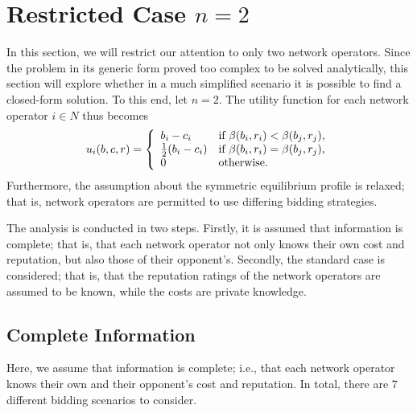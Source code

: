 \section{Restricted Case $n=2$} %
\label{sec:direct_restricted_case_n_2_direct}
In this section, we will restrict our attention to only two network operators. Since the problem in its generic form proved too complex to be solved analytically, this section will explore whether in a much simplified scenario it is possible to find a closed-form solution. To this end, let $n=2$. The utility function for each network operator $i\in N$ thus becomes
\begin{equation}
	\label{eq:utility_n_2_direct}
	u_i(b,c,r) = \left\{
	\begin{array}{l l}
		b_i - c_i &\text{if } \beta(b_i,r_i) < \beta(b_j,r_j),\\
		\frac{1}{2}(b_i - c_i) &\text{if } \beta(b_i,r_i) = \beta(b_j,r_j),\\
		0 &\text{otherwise}.
	\end{array}\right.
\end{equation}
Furthermore, the assumption about the symmetric equilibrium profile is relaxed; that is, network operators are permitted to use differing bidding strategies.

The analysis is conducted in two steps. Firstly, it is assumed that information is complete; that is, that each network operator not only knows their own cost and reputation, but also those of their opponent's. Secondly, the standard case is considered; that is, that the reputation ratings of the network operators are assumed to be known, while the costs are private knowledge.

\subsection{Complete Information} %
\label{sub:complete_information_n_2_direct}
Here, we assume that information is complete; i.e., that each network operator knows their own and their opponent's cost and reputation. In total, there are 7 different bidding scenarios to consider.

